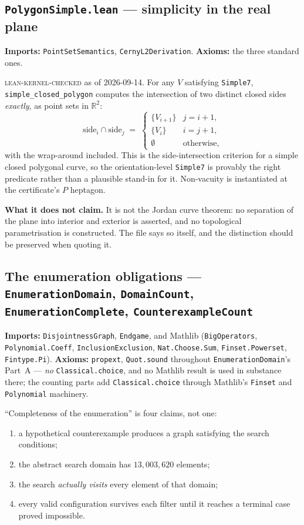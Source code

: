 \documentclass[11pt,a4paper]{article}
\theoremstyle{plain}
\theoremstyle{definition}
\theoremstyle{remark}
\newcommand{\stat}[1]{\footnotesize\textsc{#1}}
\begin{document}
\subsection*{\texttt{PolygonSimple.lean} --- simplicity in the real plane}
\textbf{Imports:} \texttt{PointSetSemantics}, \texttt{CernyL2Derivation}.
\textbf{Axioms:} the three standard ones.

\stat{lean-kernel-checked} as of 2026-09-14. For any $V$ satisfying
\texttt{Simple7}, \texttt{simple\_closed\_polygon} computes the intersection of
two distinct closed sides \emph{exactly}, as point sets in $\mathbb{R}^2$:
\[
  \mathrm{side}_i \cap \mathrm{side}_j \;=\;
  \begin{cases}
    \{V_{i+1}\} & j = i+1,\\
    \{V_i\}     & i = j+1,\\
    \emptyset   & \text{otherwise,}
  \end{cases}
\]
with the wrap-around included. This is the side-intersection criterion for a
simple closed polygonal curve, so the orientation-level \texttt{Simple7} is
provably the right predicate rather than a plausible stand-in for it. Non-vacuity
is instantiated at the certificate's $P$ heptagon.

\textbf{What it does not claim.} It is not the Jordan curve theorem: no
separation of the plane into interior and exterior is asserted, and no
topological parametrisation is constructed. The file says so itself, and the
distinction should be preserved when quoting it.

\subsection*{The enumeration obligations --- \texttt{EnumerationDomain}, \texttt{DomainCount}, \texttt{EnumerationComplete}, \texttt{CounterexampleCount}}\label{sec:enumobl}
\textbf{Imports:} \texttt{DisjointnessGraph}, \texttt{Endgame}, and Mathlib
(\texttt{BigOperators}, \texttt{Polynomial.Coeff},
\texttt{InclusionExclusion}, \texttt{Nat.Choose.Sum},
\texttt{Finset.Powerset}, \texttt{Fintype.Pi}).
\textbf{Axioms:} \texttt{propext}, \texttt{Quot.sound} throughout
\texttt{EnumerationDomain}'s Part~A --- \emph{no} \texttt{Classical.choice}, and
no Mathlib result is used in substance there; the counting parts add
\texttt{Classical.choice} through Mathlib's \texttt{Finset} and
\texttt{Polynomial} machinery.

``Completeness of the enumeration'' is four claims, not one:
\begin{enumerate}\itemsep0pt
  \item a hypothetical counterexample produces a graph satisfying the search
        conditions;
  \item the abstract search domain has $13{,}003{,}620$ elements;
  \item the search \emph{actually visits} every element of that domain;
  \item every valid configuration survives each filter until it reaches a
        terminal case proved impossible.
\end{enumerate}
\end{document}

